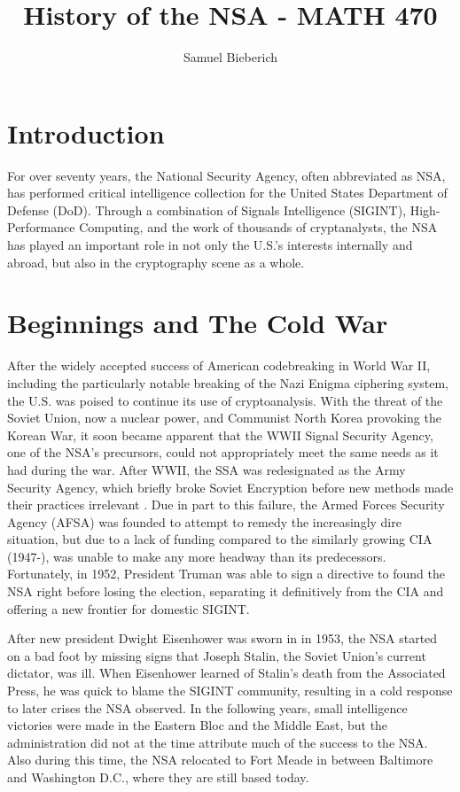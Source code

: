 \documentclass[12pt]{article}
\title{\vspace{-2.4cm}History of the NSA - MATH 470}
\author{Samuel Bieberich}
\begin{document}
\maketitle


\section{Introduction}

For over seventy years, the National Security Agency, often abbreviated as NSA, has performed critical intelligence collection for the United States Department of Defense (DoD). Through a combination of Signals Intelligence (SIGINT), High-Performance Computing, and the work of thousands of cryptanalysts, the NSA has played an important role in not only the U.S.'s interests internally and abroad, but also in the cryptography scene as a whole. 

\section{Beginnings and The Cold War}

After the widely accepted success of American codebreaking in World War II, including the particularly notable breaking of the Nazi Enigma ciphering system\cite{enigma}, the U.S. was poised to continue its use of cryptoanalysis. With the threat of the Soviet Union, now a nuclear power, and Communist North Korea provoking the Korean War, it soon became apparent that the WWII Signal Security Agency, one of the NSA's precursors, could not appropriately meet the same needs as it had during the war. After WWII, the SSA was redesignated as the Army Security Agency, which briefly broke Soviet Encryption before new methods made their practices irrelevant \cite{secret_sentry}. Due in part to this failure, the Armed Forces Security Agency (AFSA) was founded to attempt to remedy the increasingly dire situation, but due to a lack of funding compared to the similarly growing CIA (1947-), was unable to make any more headway than its predecessors. Fortunately, in 1952, President Truman was able to sign a directive to found the NSA right before losing the election\cite{Howe}, separating it definitively from the CIA and offering a new frontier for domestic SIGINT.

After new president Dwight Eisenhower was sworn in in 1953, the NSA started on a bad foot by missing signs that Joseph Stalin, the Soviet Union's current dictator, was ill\cite{secret_sentry}. When Eisenhower learned of Stalin's death from the Associated Press, he was quick to blame the SIGINT community, resulting in a cold response to later crises the NSA observed. In the following years, small intelligence victories were made in the Eastern Bloc and the Middle East, but the administration did not at the time attribute much of the success to the NSA\cite{Hatch}. Also during this time, the NSA relocated to Fort Meade in between Baltimore and Washington D.C., where they are still based today.  
\end{document}
